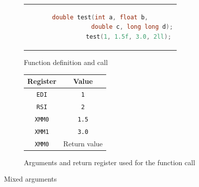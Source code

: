 \begin{figure}[htpb]
    \centering
    \begin{subfigure}{.65\textwidth}
        \centering
        \begin{tabular}{c}
            \begin{lstlisting}[language=C]
                double test(int a, float b,
                  double c, long long d);
                test(1, 1.5f, 3.0, 2ll);
            \end{lstlisting}
        \end{tabular}
        \caption{Function definition and call}
    \end{subfigure}
    \begin{subfigure}{.3\textwidth}
        \centering
        \begin{tabular}{|c|c|}
            \hline
            Register      & Value        \\
            \hline
            \texttt{EDI}  & \texttt{1}   \\
            \texttt{RSI}  & \texttt{2}   \\
            \texttt{XMM0} & \texttt{1.5} \\
            \texttt{XMM1} & \texttt{3.0} \\
            \hline
            \texttt{XMM0} & Return value \\
            \hline
        \end{tabular}
        \caption{Arguments and return register used for the function call}
    \end{subfigure}
    \caption{Mixed arguments}
    \label{tab:param-reg-ex02}
\end{figure}

